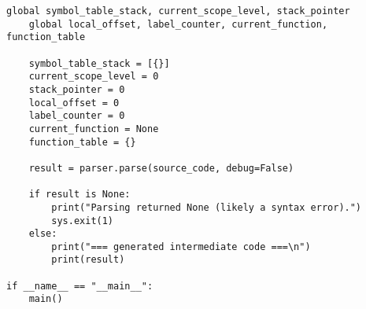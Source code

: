 \documentclass[12pt,a4paper]{report}%
\begin{document}
\begin{lstlisting}[style=pythonStyle, caption={Ficheiro lex.py}]
    global symbol_table_stack, current_scope_level, stack_pointer
    global local_offset, label_counter, current_function, function_table

    symbol_table_stack = [{}]
    current_scope_level = 0
    stack_pointer = 0
    local_offset = 0
    label_counter = 0
    current_function = None
    function_table = {}

    result = parser.parse(source_code, debug=False)

    if result is None:
        print("Parsing returned None (likely a syntax error).")
        sys.exit(1)
    else:
        print("=== generated intermediate code ===\n")
        print(result)

if __name__ == "__main__":
    main()
\end{lstlisting}
\end{document}
